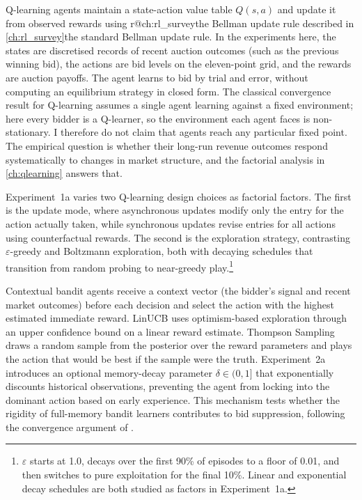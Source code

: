 Q-learning agents maintain a state-action value table $Q(s, a)$ and update it from observed rewards using \ifcsname r@ch:rl_survey\endcsname the Bellman update rule described in \cref{ch:rl_survey}\else the standard Bellman update rule\fi. In the experiments here, the states are discretised records of recent auction outcomes (such as the previous winning bid), the actions are bid levels on the eleven-point grid, and the rewards are auction payoffs. The agent learns to bid by trial and error, without computing an equilibrium strategy in closed form. The classical convergence result for Q-learning assumes a single agent learning against a fixed environment; here every bidder is a Q-learner, so the environment each agent faces is non-stationary. I therefore do not claim that agents reach any particular fixed point. The empirical question is whether their long-run revenue outcomes respond systematically to changes in market structure, and the factorial analysis in \cref{ch:qlearning} answers that.

Experiment~1a varies two Q-learning design choices as factorial factors. The first is the update mode, where asynchronous updates modify only the entry for the action actually taken, while synchronous updates revise entries for all actions using counterfactual rewards. The second is the exploration strategy, contrasting $\varepsilon$-greedy and Boltzmann exploration, both with decaying schedules that transition from random probing to near-greedy play.\footnote{$\varepsilon$ starts at 1.0, decays over the first 90\% of episodes to a floor of 0.01, and then switches to pure exploitation for the final 10\%. Linear and exponential decay schedules are both studied as factors in Experiment~1a.}

Contextual bandit agents receive a context vector (the bidder's signal and recent market outcomes) before each decision and select the action with the highest estimated immediate reward. LinUCB uses optimism-based exploration through an upper confidence bound on a linear reward estimate. Thompson Sampling draws a random sample from the posterior over the reward parameters and plays the action that would be best if the sample were the truth. Experiment~2a introduces an optional memory-decay parameter $\delta \in (0, 1]$ that exponentially discounts historical observations, preventing the agent from locking into the dominant action based on early experience. This mechanism tests whether the rigidity of full-memory bandit learners contributes to bid suppression, following the convergence argument of \citet{Douglas2024}.

